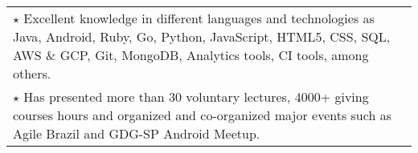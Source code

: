 \documentclass[a4paper, oneside, final]{scrartcl}
\newcommand{\vspc}{\vspace{0.15cm}} %
\begin{document}
\begin{center}
\begin{tabularx}{1\linewidth}{X}
$\star$ Excellent knowledge in different languages and technologies as Java, Android, Ruby, Go, Python, JavaScript, HTML5, CSS, SQL, AWS \& GCP, Git, MongoDB, Analytics tools, CI tools, among others. \vspc \\

$\star$ Has presented more than 30 voluntary lectures, 4000+ giving courses hours and organized and co-organized major events such as Agile Brazil and GDG-SP Android Meetup. \vspc \\







\end{tabularx}
\end{center}
\end{document}
